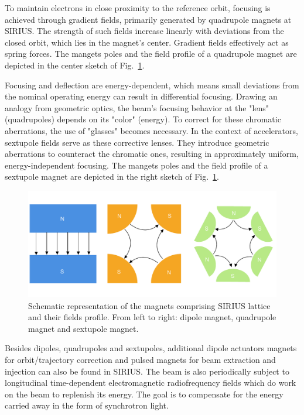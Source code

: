 To maintain electrons in close proximity to the reference orbit, focusing is achieved through gradient fields, primarily generated by quadrupole magnets at SIRIUS. The strength of such fields increase linearly with deviations from the closed orbit, which lies in the magnet's center. Gradient fields effectively act as spring forces. The mangets poles and the field profile of a quadrupole magnet are depicted in the center sketch of Fig.~\ref{fig:magnets_fields}.

Focusing and deflection are energy-dependent, which means small deviations from the nominal operating energy can result in differential focusing. Drawing an analogy from geometric optics, the beam's focusing behavior at the "lens" (quadrupoles) depends on its "color" (energy). To correct for these chromatic aberrations, the use of "glasses" becomes necessary. In the context of accelerators, sextupole fields serve as these corrective lenses. They introduce geometric aberrations to counteract the chromatic ones, resulting in approximately uniform, energy-independent focusing. The mangets poles and the field profile of a sextupole magnet are depicted in the right sketch of Fig.~\ref{fig:magnets_fields}.
\begin{figure}[htb]
    \includegraphics[width=\textwidth]{Images/magnets.pdf}
    \caption{Schematic representation of the magnets comprising SIRIUS lattice and their fields profile. From left to right: dipole magnet, quadrupole magnet and sextupole magnet.}
    \label{fig:magnets_fields}
\end{figure}

Besides dipoles, quadrupoles and sextupoles, additional dipole actuators magnets for orbit/trajectory correction and pulsed magnets for beam extraction and injection can also be found in SIRIUS. The beam is also periodically subject to longitudinal time-dependent electromagnetic radiofrequency fields which do work on the beam to replenish its energy. The goal is to compensate for the energy carried away in the form of synchrotron light.

